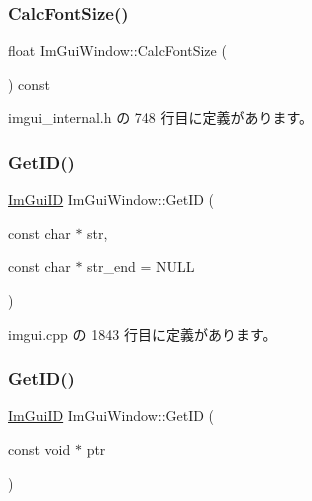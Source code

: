 \subsubsection{\texorpdfstring{Calc\+Font\+Size()}{CalcFontSize()}}
{\footnotesize\ttfamily float Im\+Gui\+Window\+::\+Calc\+Font\+Size (\begin{DoxyParamCaption}{ }\end{DoxyParamCaption}) const\hspace{0.3cm}{\ttfamily [inline]}}



 imgui\+\_\+internal.\+h の 748 行目に定義があります。

\mbox{\label{struct_im_gui_window_a66400a63bc0b54d7d29e08d1b1b1a42b}} 
\subsubsection{\texorpdfstring{Get\+I\+D()}{GetID()}\hspace{0.1cm}{\footnotesize\ttfamily [1/2]}}
{\footnotesize\ttfamily \mbox{\hyperlink{imgui_8h_a1785c9b6f4e16406764a85f32582236f}{Im\+Gui\+ID}} Im\+Gui\+Window\+::\+Get\+ID (\begin{DoxyParamCaption}\item[{const char $\ast$}]{str,  }\item[{const char $\ast$}]{str\+\_\+end = {\ttfamily NULL} }\end{DoxyParamCaption})}



 imgui.\+cpp の 1843 行目に定義があります。

\mbox{\label{struct_im_gui_window_aae21dffb343cabca9414499b827912a8}} 
\subsubsection{\texorpdfstring{Get\+I\+D()}{GetID()}\hspace{0.1cm}{\footnotesize\ttfamily [2/2]}}
{\footnotesize\ttfamily \mbox{\hyperlink{imgui_8h_a1785c9b6f4e16406764a85f32582236f}{Im\+Gui\+ID}} Im\+Gui\+Window\+::\+Get\+ID (\begin{DoxyParamCaption}\item[{const void $\ast$}]{ptr }\end{DoxyParamCaption})}



